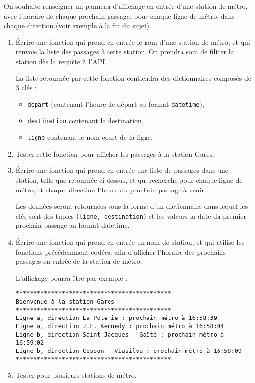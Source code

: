 \documentclass[11pt,a4paper]{article}
\begin{document}
On souhaite renseigner un panneau d'affichage en entrée d'une station de métro, avec l'horaire de chaque prochain passage, pour chaque ligne de métro, dans chaque direction (voir exemple à la fin du sujet). 

\begin{enumerate}
    \item Écrire une fonction qui prend en entrée le nom d'une station de métro, et qui renvoie la liste des passages à cette station. On prendra soin de filtrer la station dès la requête à l'API.

    La liste retournée par cette fonction contiendra des dictionnaires composés de 3 clés : 
    \begin{itemize}
        \item \verb+depart+ (contenant l'heure de départ au format \verb+datetime+), 
        \item \verb+destination+ contenant la destination,
       \item \verb+ligne+ contenant le nom court de la ligne.
    \end{itemize}
    \item Tester cette fonction pour afficher les passages à la station Gares.
    \item Écrire une fonction qui prend en entrée une liste de passages dans une station, telle que retournée ci-dessus, et qui recherche pour chaque ligne de métro, et chaque direction l'heure du prochain passage à venir. 
    
    Les données seront retournées sous la forme d'un dictionnaire dans lequel les clés sont des tuples \verb+(ligne, destination)+ et les valeurs la date du premier prochain passage au format datetime. 

    \item Écrire une fonction qui prend en entrée un nom de station, et qui utilise les fonctions précédemment codées, afin d'afficher l'horaire des prochains passages en entrée de la station de métro. 
    
    L'affichage pourra être par exemple : 
    \begin{verbatim}
********************************************
Bienvenue à la station Gares
********************************************
Ligne a, direction La Poterie : prochain métro à 16:58:39
Ligne a, direction J.F. Kennedy : prochain métro à 16:58:04
Ligne b, direction Saint-Jacques - Gaîté : prochain métro à 16:59:02
Ligne b, direction Cesson - Viasilva : prochain métro à 16:58:09
********************************************
\end{verbatim}
\item Tester pour plusieurs stations de métro.
\end{enumerate}
\end{document}
